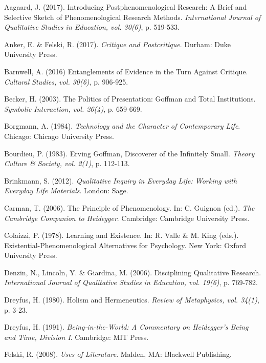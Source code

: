 \label{paper4:references}
\begin{thebibliography}{99}

\item Aagaard, J. (2017). Introducing Postphenomenological Research: A Brief and Selective Sketch of Phenomenological Research Methods. \textit{International Journal of Qualitative Studies in Education, vol. 30(6)}, p. 519-533.
\item Anker, E. \& Felski, R. (2017). \textit{Critique and Postcritique}. Durham: Duke University Press.
\item Barnwell, A. (2016) Entanglements of Evidence in the Turn Against Critique. \textit{Cultural Studies, vol. 30(6)}, p. 906-925.
\item Becker, H. (2003). The Politics of Presentation: Goffman and Total Institutions. \textit{Symbolic Interaction, vol. 26(4)}, p. 659-669.
\item Borgmann, A. (1984). \textit{Technology and the Character of Contemporary Life}. Chicago: Chicago University Press.
\item Bourdieu, P. (1983). Erving Goffman, Discoverer of the Infinitely Small. \textit{Theory Culture \& Society, vol. 2(1)}, p. 112-113.
\item Brinkmann, S. (2012). \textit{Qualitative Inquiry in Everyday Life: Working with Everyday Life Materials}. London: Sage.
\item Carman, T. (2006). The Principle of Phenomenology. In: C. Guignon (ed.). \textit{The Cambridge Companion to Heidegger}. Cambridge: Cambridge University Press.
\item Colaizzi, P. (1978). Learning and Existence. In: R. Valle \& M. King (eds.). Existential-Phenomenological Alternatives for Psychology. New York: Oxford University Press.
\item Denzin, N., Lincoln, Y. \& Giardina, M. (2006). Disciplining Qualitative Research. \textit{International Journal of Qualitative Studies in Education, vol. 19(6)}, p. 769-782.
\item Dreyfus, H. (1980). Holism and Hermeneutics. \textit{Review of Metaphysics, vol. 34(1)}, p. 3-23.
\item Dreyfus, H. (1991). \textit{Being-in-the-World: A Commentary on Heidegger’s Being and Time, Division I}. Cambridge: MIT Press.
\item Felski, R. (2008). \textit{Uses of Literature}. Malden, MA: Blackwell Publishing.

\end{thebibliography}
